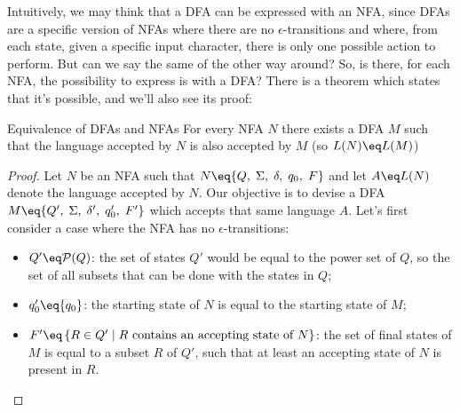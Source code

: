 \begin{example}
    \begin{center}
    \end{center}
\end{example}

Intuitively, we may think that a DFA can be expressed with an NFA, since DFAs are a specific version of NFAs where there are no $\epsilon$-transitions and where, from each state, given a specific input character, there is only one possible action to perform. But can we say the same of the other way around? So, is there, for each NFA, the possibility to express is with a DFA? There is a theorem which states that it's possible, and we'll also see its proof:
\pagebreak %

\begin{theorem}{Equivalence of DFAs and NFAs}
    For every NFA $N$ there exists a DFA $M$ such that the language accepted by $N$ is also accepted by $M$ (so $L(N) \eq L(M)$)

    \begin{proof}
        Let $N$ be an NFA such that $N \eq \{Q, \; \Sigma, \; \delta, \; q_0, \; F \}$ and let $A \eq L(N)$ denote the language accepted by $N$. Our objective is to devise a DFA $M \eq \{Q', \; \Sigma, \; \delta', \; q_0', \; F' \}$ which accepts that same language $A$.
        Let's first consider a case where the NFA has no $\epsilon$-transitions:
        \begin{itemize}
            \item $Q' \eq \mathcal{P}(Q)$: the set of states $Q'$ would be equal to the power set of $Q$, so the set of all subsets that can be done with the states in $Q$;
            \item $q_0' \eq \{ q_0 \}$: the starting state of $N$ is equal to the starting state of $M$;
            \item $F' \eq \left\{ R \in Q' \; | \; R \text{ contains an accepting state of } N \right\}$: the set of final states of $M$ is equal to a subset $R$ of $Q'$, such that at least an accepting state of $N$ is present in $R$.
        \end{itemize}
    \end{proof}
\end{theorem}